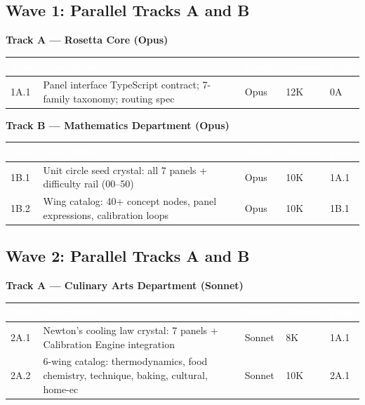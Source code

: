 \documentclass[11pt,letterpaper]{article}
\newcommand{\tableheader}[1]{\textbf{\sffamily\textcolor{white}{#1}}}
\begin{document}
\subsection{Wave 1: Parallel Tracks A and B}

\textbf{Track A --- Rosetta Core (Opus)}

\begin{center}
\begin{tabularx}{\textwidth}{C{1.2cm}L{5cm}C{2cm}C{2cm}C{2cm}}
\toprule
{}
\tableheader{Task} & \tableheader{Description} & \tableheader{Model} & \tableheader{Tokens} & \tableheader{Deps} \\
\midrule
1A.1 & Panel interface TypeScript contract; 7-family taxonomy; routing spec & Opus & 12K & 0A \\
\bottomrule
\end{tabularx}
\end{center}

\textbf{Track B --- Mathematics Department (Opus)}

\begin{center}
\begin{tabularx}{\textwidth}{C{1.2cm}L{5cm}C{2cm}C{2cm}C{2cm}}
\toprule
{}
\tableheader{Task} & \tableheader{Description} & \tableheader{Model} & \tableheader{Tokens} & \tableheader{Deps} \\
\midrule
1B.1 & Unit circle seed crystal: all 7 panels + difficulty rail (00--50) & Opus & 10K & 1A.1 \\
1B.2 & Wing catalog: 40+ concept nodes, panel expressions, calibration loops & Opus & 10K & 1B.1 \\
\bottomrule
\end{tabularx}
\end{center}

\subsection{Wave 2: Parallel Tracks A and B}

\textbf{Track A --- Culinary Arts Department (Sonnet)}

\begin{center}
\begin{tabularx}{\textwidth}{C{1.2cm}L{5cm}C{2cm}C{2cm}C{2cm}}
\toprule
{}
\tableheader{Task} & \tableheader{Description} & \tableheader{Model} & \tableheader{Tokens} & \tableheader{Deps} \\
\midrule
2A.1 & Newton's cooling law crystal: 7 panels + Calibration Engine integration & Sonnet & 8K & 1A.1 \\
2A.2 & 6-wing catalog: thermodynamics, food chemistry, technique, baking, cultural, home-ec & Sonnet & 10K & 2A.1 \\
\bottomrule
\end{tabularx}
\end{center}
\end{document}

